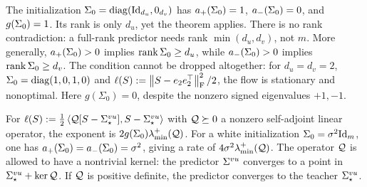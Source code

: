 \begin{remark}\label{rem:singular-support}
The initialization $\Sigma_0=\operatorname{diag}(\mathrm{Id}_{d_u},0_{d_v})$ has
$a_+(\Sigma_0)=1$, $a_-(\Sigma_0)=0$, and $g(\Sigma_0)=1$.
Its rank is only $d_u$, yet the theorem applies. There is no rank
contradiction: a full-rank predictor needs rank $\min(d_u,d_v)$, not $m$.
More generally, $a_+(\Sigma_0)>0$ implies $\operatorname{rank}\Sigma_0\ge d_u$,
while $a_-(\Sigma_0)>0$ implies $\operatorname{rank}\Sigma_0\ge d_v$.
The condition cannot be dropped altogether: for $d_u=d_v=2$,
$\Sigma_0=\operatorname{diag}(1,0,1,0)$ and
$\ell(S):=\left\lVert S-e_2e_2^\top \right\rVert_{\mathrm{F}}^2/2$, the flow is stationary and
nonoptimal. Here $g(\Sigma_0) = 0$, despite the nonzero signed eigenvalues $+1,-1$.
\end{remark}

\begin{remark}
For $\ell(S):=\frac12\left\langle \mathcal Q[S-\Sigma^{vu}_\star],S-\Sigma^{vu}_\star \right\rangle$ with
$\mathcal Q\succeq0$ a nonzero self-adjoint linear operator, the exponent is
$2g(\Sigma_0)\lambda_{\min}^{+}(\mathcal Q)$. For a white initialization
$\Sigma_0=\sigma^2\mathrm{Id}_m$, one has $a_+(\Sigma_0)=a_-(\Sigma_0)=\sigma^2$,
giving a rate of $4\sigma^2\lambda_{\min}^{+}(\mathcal Q)$.
The operator $\mathcal Q$ is allowed to have a nontrivial kernel: the predictor $\Sigma^{vu}$ converges to a point in
$\Sigma^{vu}_\star+\operatorname{ker}\mathcal Q$. If $\mathcal Q$ is positive definite, the predictor converges to the teacher $\Sigma^{vu}_\star$.
\end{remark}

